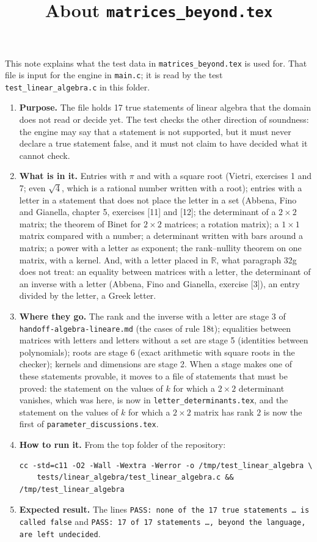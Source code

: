\documentclass[11pt,a4paper]{article}
\title{About \texttt{matrices\_beyond.tex}}
\author{}
\date{}
\begin{document}
\maketitle
This note explains what the test data in \texttt{matrices\_beyond.tex} is used for. That file is input for the engine in \texttt{main.c}; it is read by the test \texttt{test\_linear\_algebra.c} in this folder.

\begin{enumerate}
\item \textbf{Purpose.} The file holds 17 true statements of linear algebra that the domain does not read or decide yet. The test checks the other direction of soundness: the engine may say that a statement is not supported, but it must never declare a true statement false, and it must not claim to have decided what it cannot check.

\item \textbf{What is in it.} Entries with $\pi$ and with a square root (Vietri, exercises 1 and 7; even $\sqrt{4}$, which is a rational number written with a root); entries with a letter in a statement that does not place the letter in a set (Abbena, Fino and Gianella, chapter 5, exercises [11] and [12]; the determinant of a $2 \times 2$ matrix; the theorem of Binet for $2 \times 2$ matrices; a rotation matrix); a $1 \times 1$ matrix compared with a number; a determinant written with bars around a matrix; a power with a letter as exponent; the rank--nullity theorem on one matrix, with a kernel. And, with a letter placed in $\mathbb{R}$, what paragraph 32g does not treat: an equality between matrices with a letter, the determinant of an inverse with a letter (Abbena, Fino and Gianella, exercise [3]), an entry divided by the letter, a Greek letter.

\item \textbf{Where they go.} The rank and the inverse with a letter are stage 3 of \texttt{handoff-algebra-lineare.md} (the cases of rule 18t); equalities between matrices with letters and letters without a set are stage 5 (identities between polynomials); roots are stage 6 (exact arithmetic with square roots in the checker); kernels and dimensions are stage 2. When a stage makes one of these statements provable, it moves to a file of statements that must be proved: the statement on the values of $k$ for which a $2 \times 2$ determinant vanishes, which was here, is now in \texttt{letter\_determinants.tex}, and the statement on the values of $k$ for which a $2 \times 2$ matrix has rank $2$ is now the first of \texttt{parameter\_discussions.tex}.

\item \textbf{How to run it.} From the top folder of the repository:
\begin{verbatim}
cc -std=c11 -O2 -Wall -Wextra -Werror -o /tmp/test_linear_algebra \
    tests/linear_algebra/test_linear_algebra.c && /tmp/test_linear_algebra
\end{verbatim}

\item \textbf{Expected result.} The lines \texttt{PASS: none of the 17 true statements \dots{} is called false} and \texttt{PASS: 17 of 17 statements \dots{}, beyond the language, are left undecided}.
\end{enumerate}
\end{document}
